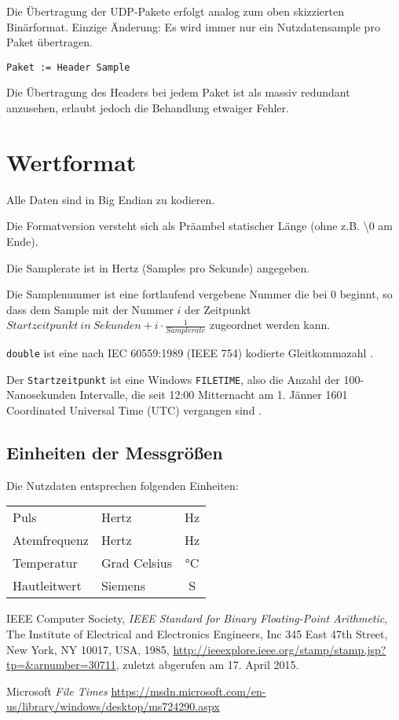 \documentclass[a4paper,parskip=full,oneside]{scrartcl}
\begin{document}
Die Übertragung der UDP-Pakete erfolgt analog zum oben skizzierten Binärformat.
Einzige Änderung: Es wird immer nur ein Nutzdatensample pro Paket übertragen.

\begin{verbatim}
Paket := Header Sample
\end{verbatim}

Die Übertragung des Headers bei jedem Paket ist als massiv redundant anzusehen,
erlaubt jedoch die Behandlung etwaiger Fehler.

\section{Wertformat}

Alle Daten sind in Big Endian zu kodieren.

Die Formatversion versteht sich als Präambel statischer Länge
(ohne z.B. \textbackslash{}0 am Ende).

Die Samplerate ist in Hertz (Samples pro Sekunde) angegeben.

Die Samplenummer ist eine fortlaufend vergebene Nummer die bei $0$ beginnt,
so dass dem Sample mit der Nummer $i$ der Zeitpunkt
$\mathit{Startzeitpunkt\ in\ Sekunden} + i \cdot \frac{1}{\mathit{Samplerate}}$
zugeordnet werden kann.

\texttt{double} ist eine nach IEC 60559:1989 (IEEE 754) kodierte Gleitkommazahl \cite{ieee745}.

Der \texttt{Startzeitpunkt} ist eine Windows \texttt{FILETIME},
also die Anzahl der 100-Nanosekunden
Intervalle, die seit 12:00 Mitternacht am 1. Jänner 1601
Coordinated Universal Time (UTC) vergangen sind \cite{filetime}.

\subsection{Einheiten der Messgrößen}
Die Nutzdaten entsprechen folgenden Einheiten:

\begin{tabular}{llc}
Puls & Hertz & Hz \\
Atemfrequenz & Hertz & Hz \\
Temperatur & Grad Celsius & °C \\
Hautleitwert & Siemens & S \\
\end{tabular}

\begin{thebibliography}{9}

  IEEE Computer Society,
  \emph{IEEE Standard for Binary Floating-Point Arithmetic},
  The Institute of Electrical and Electronics Engineers, Inc 345 East 47th Street, New York, NY 10017, USA,
  1985, \url{http://ieeexplore.ieee.org/stamp/stamp.jsp?tp=&arnumber=30711}, zuletzt abgerufen am 17. April 2015.

	Microsoft
	\emph{File Times}
	\url{https://msdn.microsoft.com/en-us/library/windows/desktop/ms724290.aspx}
\end{thebibliography}
\end{document}

